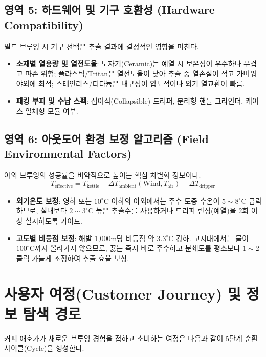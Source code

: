 \documentclass[10pt,a4paper]{article}
\begin{document}
\subsection{영역 5: 하드웨어 및 기구 호환성 (Hardware Compatibility)}
필드 브루잉 시 기구 선택은 추출 결과에 결정적인 영향을 미친다.
\begin{itemize}[itemsep=2pt]
    \item \textbf{소재별 열용량 및 열전도율}: 도자기(Ceramic)는 예열 시 보온성이 우수하나 무겁고 파손 위험; 플라스틱/Tritan은 열전도율이 낮아 추출 중 열손실이 적고 가벼워 야외에 최적; 스테인리스/티타늄은 내구성이 압도적이나 외기 열교환이 빠름.
    \item \textbf{패킹 부피 및 수납 스펙}: 접이식(Collapsible) 드리퍼, 분리형 핸들 그라인더, 케이스 일체형 모듈 여부.
\end{itemize}

\subsection{영역 6: 아웃도어 환경 보정 알고리즘 (Field Environmental Factors)}
야외 브루잉의 성공률을 비약적으로 높이는 핵심 차별화 정보이다.
\begin{equation}
    T_{\text{effective}} = T_{\text{kettle}} - \Delta T_{\text{ambient}}(\text{Wind}, T_{\text{air}}) - \Delta T_{\text{dripper}}
\end{equation}
\begin{itemize}[itemsep=2pt]
    \item \textbf{외기온도 보정}: 영하 또는 $10^\circ\text{C}$ 이하의 야외에서는 주수 도중 수온이 $5\sim 8^\circ\text{C}$ 급락하므로, 실내보다 $2\sim 3^\circ\text{C}$ 높은 추출수를 사용하거나 드리퍼 린싱(예열)을 2회 이상 실시하도록 가이드.
    \item \textbf{고도별 비등점 보정}: 해발 1,000m당 비등점 약 $3.3^\circ\text{C}$ 강하. 고지대에서는 물이 $100^\circ\text{C}$까지 올라가지 않으므로, 끓는 즉시 바로 주수하고 분쇄도를 평소보다 $1\sim 2$클릭 가늘게 조정하여 추출 효율 보상.
\end{itemize}

\section{사용자 여정(Customer Journey) 및 정보 탐색 경로}

커피 애호가가 새로운 브루잉 경험을 접하고 소비하는 여정은 다음과 같이 5단계 순환 사이클(Cycle)을 형성한다.
\end{document}
